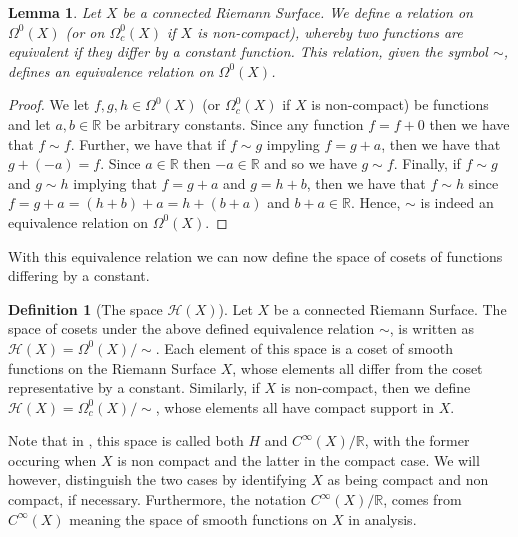 \documentclass[a4paper,12pt]{report}
\theoremstyle{plain}
\newtheorem{lemma}[thm]{Lemma}
\theoremstyle{definition}
\newtheorem{defn}[thm]{Definition}
\begin{document}


\begin{lemma}
  Let $X$ be a connected Riemann Surface. We define a relation on $\Omega^0(X)$ (or on $\Omega^0_c(X)$ if $X$ is non-compact), whereby two functions are equivalent if they differ by a constant function. This relation, given the symbol $\sim$, defines an equivalence relation on $\Omega^0(X)$.
\end{lemma}

\begin{proof}
  We let $f,g,h \in \Omega^0(X)$ (or $\Omega^0_c(X)$ if $X$ is non-compact) be functions and let $a, b \in \mathbb{R}$ be arbitrary constants. 
  Since any function $f = f + 0$ then we have that $f \sim f$. 
  Further, we have that if $f \sim g$ impyling $f = g + a$, then we have that $g + (-a) = f$. Since $a \in \mathbb{R}$ then $-a \in \mathbb{R}$ and so we have $g \sim f$. 
  Finally, if $f \sim g$ and $g \sim h$ implying that $f = g + a$ and $g = h + b$, then we have that $f \sim h$ since $f = g + a = (h + b) + a = h + (b + a)$ and $b+a \in \mathbb{R}$. Hence, $\sim$ is indeed an equivalence relation on $\Omega^0(X)$. 
\end{proof}

With this equivalence relation we can now define the space of cosets of functions differing by a constant.

\begin{defn}[The space $\mathcal{H}(X)$]
  Let $X$ be a connected Riemann Surface. The space of cosets under the above defined equivalence relation $\sim$, is written as $\mathcal{H}(X) = \Omega^0(X)/\sim$. Each element of this space is a coset of smooth functions on the Riemann Surface $X$, whose elements all differ from the coset representative by a constant. 
  Similarly, if $X$ is non-compact, then we define $\mathcal{H}(X) = \Omega^0_c(X)/\sim$, whose elements all have compact support in $X$.
\end{defn}

Note that in \cite{donaldson}, this space is called both $H$ and $C^{\infty}(X)/\mathbb{R}$, with the former occuring when $X$ is non compact and the latter in the compact case. We will however, distinguish the two cases by identifying $X$ as being compact and non compact, if necessary. Furthermore, the notation $C^{\infty}(X)/\mathbb{R}$, comes from $C^{\infty}(X)$ meaning the space of smooth functions on $X$ in analysis. 
\end{document}
